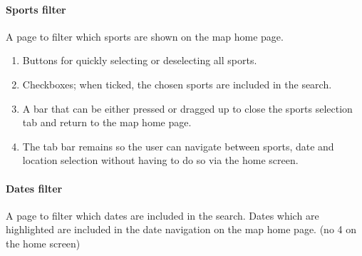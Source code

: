 \paragraph{Sports filter}

A page to filter which sports are shown on the map home page.

\begin{enumerate}
	\item Buttons for quickly selecting or deselecting all sports.
	\item Checkboxes; when ticked, the chosen sports are included in the
		search.
	\item A bar that can be either pressed or dragged up to close the sports
		selection tab and return to the map home page.
	\item The tab bar remains so the user can navigate between sports, date and
		location selection without having to do so via the home screen.
\end{enumerate}

\paragraph{Dates filter}

A page to filter which dates are included in the search. Dates which are
highlighted are included in the date navigation on the map home page. (no 4 on
the home screen)

